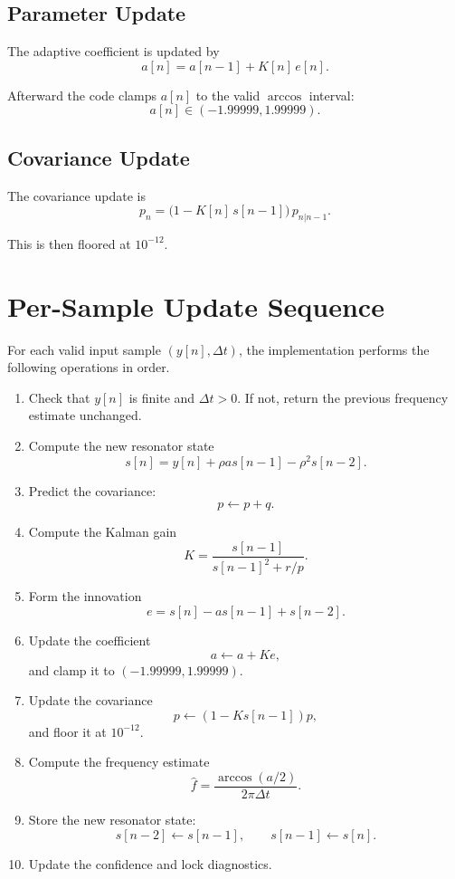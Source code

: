 \documentclass[conference]{IEEEtran}
\begin{document}
\subsection{Parameter Update}

The adaptive coefficient is updated by
\begin{equation}\label{eq:a_update}
  a[n] = a[n-1] + K[n]\,e[n].
\end{equation}

Afterward the code clamps $a[n]$ to the valid $\arccos$ interval:
\begin{equation}
  a[n] \in (-1.99999,1.99999).
\end{equation}

\subsection{Covariance Update}

The covariance update is
\begin{equation}\label{eq:p_update}
  p_n = \bigl(1 - K[n]\,s[n-1]\bigr)\,p_{n|n-1}.
\end{equation}

This is then floored at $10^{-12}$.

\section{Per-Sample Update Sequence}\label{sec:update}

For each valid input sample $(y[n],\Delta t)$, the implementation performs the
following operations in order.

\begin{enumerate}[leftmargin=1.6em]
  \item Check that $y[n]$ is finite and $\Delta t > 0$. If not, return the
        previous frequency estimate unchanged.
  \item Compute the new resonator state
        \[
          s[n] = y[n] + \rho a s[n-1] - \rho^2 s[n-2].
        \]
  \item Predict the covariance:
        \[
          p \leftarrow p + q.
        \]
  \item Compute the Kalman gain
        \[
          K = \frac{s[n-1]}{s[n-1]^2 + r/p}.
        \]
  \item Form the innovation
        \[
          e = s[n] - a s[n-1] + s[n-2].
        \]
  \item Update the coefficient
        \[
          a \leftarrow a + K e,
        \]
        and clamp it to $(-1.99999,1.99999)$.
  \item Update the covariance
        \[
          p \leftarrow (1-Ks[n-1])p,
        \]
        and floor it at $10^{-12}$.
  \item Compute the frequency estimate
        \[
          \hat f = \frac{\arccos(a/2)}{2\pi\Delta t}.
        \]
  \item Store the new resonator state:
        \[
          s[n-2] \leftarrow s[n-1],\qquad
          s[n-1] \leftarrow s[n].
        \]
  \item Update the confidence and lock diagnostics.
\end{enumerate}
\end{document}

